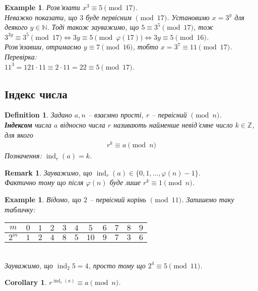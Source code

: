 \documentclass[a4paper, 14pt]{extarticle}
\theoremstyle{theoremdd}
\theoremstyle{theoremdd}
\newtheorem{definition}[theorem]{Definition}
\theoremstyle{theoremdd}
\theoremstyle{theoremdd}
\newtheorem{example}[theorem]{Example}
\theoremstyle{theoremdd}
\theoremstyle{theoremdd}
\newtheorem{remark}[theorem]{Remark}
\theoremstyle{theoremdd}
\theoremstyle{theoremdd}
\newtheorem{corollary}[theorem]{Corollary}
\DeclareMathOperator{\ind}{ind}
\begin{document}
\begin{example}
Розв'язати $x^3 \equiv 5 \pmod {17}$.\\
Неважко показати, що $3$ буде первісним $\!\! \pmod {17}$. Установимо $x = 3^y$ для деякого $y \in \mathbb{N}$. Тоді також зауважимо, що $5 \equiv 3^5 \pmod {17}$, тож\\
$3^{3y} \equiv 3^5 \pmod {17} \iff 3y \equiv 5 \pmod {\varphi(17)} \iff 3y \equiv 5 \pmod {16}$.\\
Розв'язавши, отримаємо $y \equiv 7 \pmod {16}$, тобто $x = 3^7 \equiv 11 \pmod {17}$.\\
Перевірка:\\
$11^3 = 121 \cdot 11 \equiv 2 \cdot 11 = 22 \equiv 5 \pmod {17}$.
\end{example}

\subsection{Індекс числа}
\begin{definition}
Задано $a,n$ -- взаємно прості, $r$ -- первісний $\pmod n$.\\
\textbf{Індексом} числа $a$ відносно числа $r$ називають найменше невід'ємне число $k \in \mathbb{Z}$, для якого
\begin{align*}
r^k \equiv a \pmod n
\end{align*}
Позначення: $\ind_r (a) = k$.
\end{definition}

\begin{remark}
Зауважимо, що $\ind_r (a) \in \{0,1,\dots,\varphi(n)-1\}$.\\
Фактично тому що після $\varphi(n)$ буде лише $r^k \equiv 1 \pmod n$.
\end{remark}

\begin{example}
Відомо, що $2$ -- первісний корінь $\!\! \pmod {11}$. Запишемо таку табличку:\\
\begin{tabular}{c|c|c|c|c|c|c|c|c|c|c}
$m$ & $0$ & $1$ & $2$ & $3$ & $4$ & $5$ & $6$ & $7$ & $8$ & $9$ \\
\hline
$2^m$ & $1$ & $2$ & $4$ & $8$ & $5$ & $10$ & $9$ & $7$ & $3$ & $6$
\end{tabular}\\
Зауважимо, що $\ind_2 5 = 4$, просто тому що $2^4 \equiv 5 \pmod {11}$.
\end{example}

\begin{corollary}
$r^{\ind_r(a)} \equiv a \pmod n$.
\end{corollary}
\end{document}
